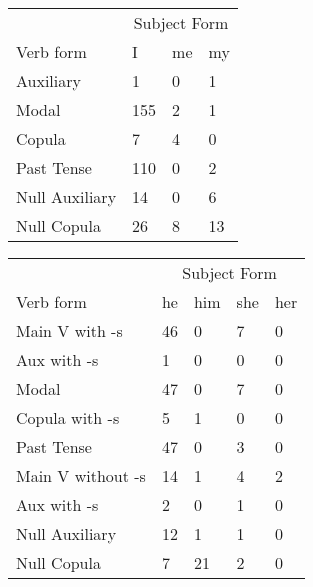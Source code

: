 \begin{table}[]
    \begin{minipage}{0.5\textwidth}
    \centering
    \begin{tabular}{@{}llll@{}}
        \toprule
            &\multicolumn{3}{c}{Subject Form}\\
            \cline{2-4}
        Verb form & I & me & my \\
        \midrule
        Auxiliary & 1 & 0 & 1 \\
        Modal & 155 & 2 & 1 \\
        Copula & 7 & 4 & 0 \\
        Past Tense & 110 & 0 & 2 \\
        \hline
        Null Auxiliary & 14 & 0 & 6 \\
        Null Copula & 26 & 8 & 13 \\
        \bottomrule
    \end{tabular}
\end{minipage}
\begin{minipage}{0.5\textwidth}
    \centering
    \begin{tabular}{@{}lllll@{}}
        \toprule
            &\multicolumn{4}{c}{Subject Form}\\
            \cline{2-5}
        Verb form & he & him & she & her \\
        \midrule
        Main V with -s & 46 & 0 & 7 & 0 \\
        Aux with -s & 1 & 0 & 0 & 0 \\
        Modal & 47 & 0 & 7 & 0 \\
        Copula with -s & 5 & 1 & 0 & 0 \\
        Past Tense & 47 & 0 & 3 & 0 \\
        \hline
        Main V without -s & 14 & 1 & 4 & 2 \\
        Aux with -s & 2 & 0 & 1 & 0 \\
        Null Auxiliary & 12 & 1 & 1 & 0 \\
        Null Copula & 7 & 21 & 2 & 0 \\
        \bottomrule
    \end{tabular}
\end{minipage}
\end{table}
